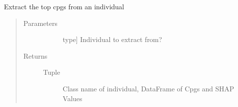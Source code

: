 \documentclass[letterpaper,10pt,english]{sphinxmanual}
\begin{document}
\begin{fulllineitems}
\begin{fulllineitems}
\begin{quote}
\begin{description}
\begin{description}
\end{description}

\end{description}\end{quote}

\end{fulllineitems}


\begin{fulllineitems}
\label{\detokenize{index:methylnet.interpretation_classes.ShapleyDataExplorer.extract_individual}}
Extract the top cpgs from an individual
\begin{quote}\begin{description}
\item[{Parameters}] \leavevmode\begin{description}
\item[{}] \leavevmode{[}type{]}
Individual to extract from?

\end{description}

\item[{Returns}] \leavevmode\begin{description}
\item[{Tuple}] \leavevmode
Class name of individual, DataFrame of Cpgs and SHAP Values

\end{description}

\end{description}\end{quote}

\end{fulllineitems}



\end{fulllineitems}
\end{document}
